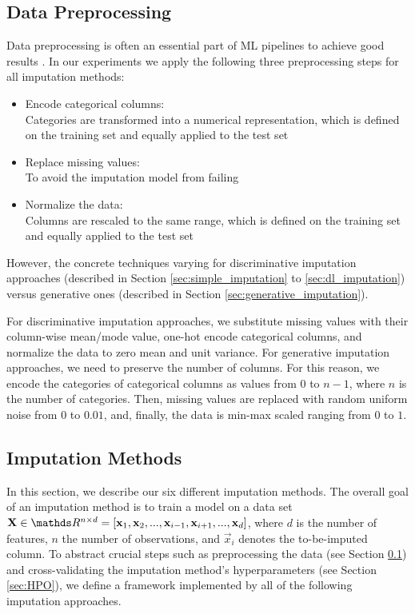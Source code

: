 \subsection{Data Preprocessing}
\label{sec:preprocessing}
%
Data preprocessing is often an essential part of ML pipelines to achieve good results \citep{Sculley2015}. In our experiments we apply the following three preprocessing steps for all imputation methods:
%
\begin{itemize}
	\item Encode categorical columns: \\
		Categories are transformed into a numerical representation, which is defined on the training set and equally applied to the test set

	\item Replace missing values: \\
		To avoid the imputation model from failing

	\item Normalize the data: \\
		Columns are rescaled to the same range, which is defined on the training set and equally applied to the test set
\end{itemize}
%
However, the concrete techniques varying for discriminative imputation approaches (described in Section \ref{sec:simple_imputation} to \ref{sec:dl_imputation}) versus generative ones (described in Section \ref{sec:generative_imputation}).

For discriminative imputation approaches, we substitute missing values with their column-wise mean/mode value, one-hot encode categorical columns, and normalize the data to zero mean and unit variance.
For generative imputation approaches, we need to preserve the number of columns. For this reason, we encode the categories of categorical columns as values from $0$ to $n-1$, where $n$ is the number of categories. Then, missing values are replaced with random uniform noise from $0$ to $0.01$, and, finally, the data is min-max scaled ranging from $0$ to $1$.

\subsection{Imputation Methods}
\label{sec:methods:impuation}
%
In this section, we describe our six different imputation methods. The overall goal of an imputation method is to train a model on a data set $\vec{X}\in\R^{n\times d} = [\vec{x}_1, \vec{x}_2, ..., \vec{x}_{i-1}, \vec{x}_{i+1}, ..., \vec{x}_d]$, where $d$ is the number of features, $n$ the number of observations, and $\vec{x}_i$ denotes the to-be-imputed column.
To abstract crucial steps such as preprocessing the data (see Section \ref{sec:preprocessing}) and cross-validating the imputation method's hyperparameters (see Section \ref{sec:HPO}), we define a framework implemented by all of the following imputation approaches.


